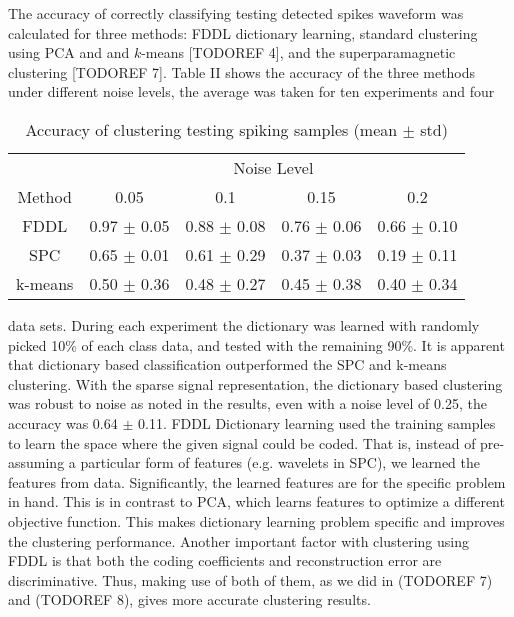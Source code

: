 \documentclass[conference]{IEEEtran}
\begin{document}
	The accuracy of correctly classifying testing detected spikes waveform was calculated for three methods: FDDL dictionary learning, standard clustering using PCA and and $k$-means [TODOREF 4], and the superparamagnetic clustering [TODOREF 7]. Table II shows the accuracy of the three methods under different noise levels, the average was taken for ten experiments and four
	
	\begin{table}
		\caption{Accuracy of clustering testing spiking samples (mean $\pm$ std)}
		\label{tab:acc_clust}
		\begin{tabularx}{\columnwidth}{c c c c c}
			\cmidrule{2-5}
			& \multicolumn{4}{c}{Noise Level} \\
			\cmidrule{2-5}
			Method & 0.05 & 0.1 & 0.15 & 0.2 \\
			\cmidrule[0.7pt]{1-5}
			FDDL & 0.97 $\pm$ 0.05 & 0.88 $\pm$ 0.08 & 0.76 $\pm$ 0.06 & 0.66 $\pm$ 0.10 \\
			SPC & 0.65 $\pm$ 0.01 & 0.61 $\pm$ 0.29 & 0.37 $\pm$ 0.03 & 0.19 $\pm$ 0.11 \\
			k-means & 0.50 $\pm$ 0.36 & 0.48 $\pm$ 0.27 & 0.45 $\pm$ 0.38 & 0.40 $\pm$ 0.34 \\
			\cmidrule[0.7pt]{1-5}
		\end{tabularx}
	\end{table}

	data sets. During each experiment the dictionary was learned with randomly picked 10\% of each class data, and tested with the remaining 90\%. It is apparent that dictionary based classification outperformed the SPC and k-means clustering. With the sparse signal representation, the dictionary based clustering was robust to noise as noted in the results, even with a noise level of 0.25, the accuracy was 0.64 $\pm$ 0.11. FDDL Dictionary learning used the training samples to learn the space where the given signal could be coded. That is, instead of pre-assuming a particular form of features (e.g. wavelets in SPC), we learned the features from data. Significantly, the learned features are for the specific problem in hand. This is in contrast to PCA, which learns features to optimize a different objective function. This makes dictionary learning problem specific and improves the clustering performance. Another important factor with clustering using FDDL is that both the coding coefficients and reconstruction error are discriminative. Thus, making use of both of them, as we did in (TODOREF 7) and (TODOREF 8), gives more accurate clustering results.
	
\end{document}
